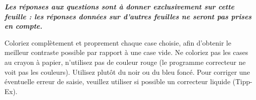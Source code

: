 \documentclass[a4paper]{article}
\begin{document}
{{\begin{minipage}[b]{6.5cm}
\hfill{}\hfill\vspace{5ex}

\end{minipage}\hspace*{\fill}

}

\vspace{5ex}

{\bf\em\setlength{\parindent}{0pt} Les réponses aux questions sont à donner exclusivement sur cette feuille :
  les réponses données sur d'autres feuilles ne seront pas prises en compte.

\vspace{1ex}
Coloriez complètement et proprement chaque case choisie, afin d'obtenir le meilleur contraste possible
par rapport à une case vide. Ne coloriez pas les cases au crayon à papier, n'utilisez pas de 
couleur rouge (le programme correcteur ne voit pas les couleurs). Utilisez plutôt du noir ou du bleu foncé.
Pour corriger une éventuelle erreur de saisie, veuillez utiliser si possible un correcteur liquide (Tipp-Ex).
}

\vspace{2ex}


\begin{multicols}{2}
\setlength{\parindent}{0pt}
\formulaire    
\end{multicols}

\clearpage    

}  
\end{document}
